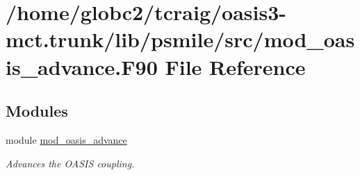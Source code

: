 \hypertarget{mod__oasis__advance_8_f90}{}\section{/home/globc2/tcraig/oasis3-\/mct.trunk/lib/psmile/src/mod\+\_\+oasis\+\_\+advance.F90 File Reference}
\label{mod__oasis__advance_8_f90}
\subsection*{Modules}
\begin{DoxyCompactItemize}
\item 
module \hyperlink{namespacemod__oasis__advance}{mod\+\_\+oasis\+\_\+advance}
\begin{DoxyCompactList}\small\item\em Advances the O\+A\+S\+IS coupling. \end{DoxyCompactList}\end{DoxyCompactItemize}
